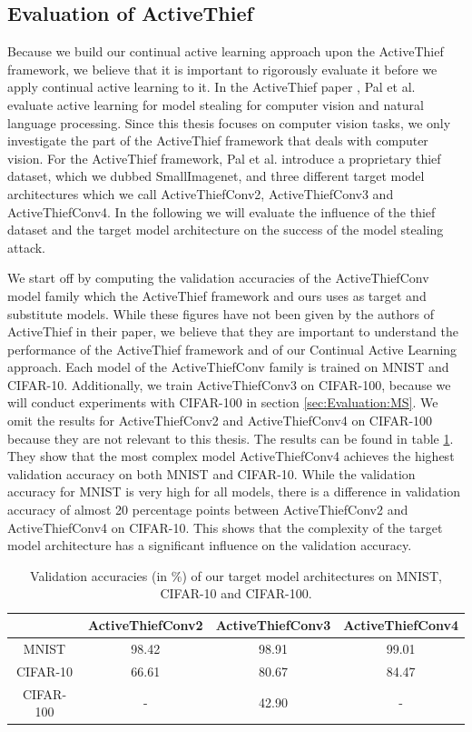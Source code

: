 \subsection{Evaluation of ActiveThief}
\label{sec:Appendix:MS:ActiveThief}
Because we build our continual active learning approach upon the ActiveThief framework, we believe that it is important to rigorously evaluate it before we apply continual
active learning to it. In the ActiveThief paper \cite{pal2020activethief}, Pal et al. evaluate active learning for model stealing for computer vision and natural language
processing. Since this thesis focuses on computer vision tasks, we only investigate the part of the ActiveThief framework that deals with computer vision. For the ActiveThief
framework, Pal et al. introduce a proprietary thief dataset, which we dubbed SmallImagenet, and three different target model architectures which we call ActiveThiefConv2,
ActiveThiefConv3 and ActiveThiefConv4. In the following we will evaluate the influence of the thief dataset and the target model architecture on
the success of the model stealing attack. \par
We start off by computing the validation accuracies of the ActiveThiefConv model family which the ActiveThief framework and ours uses as target and substitute models. While
these figures have not been given by the authors of ActiveThief in their paper, we believe that they are important to understand the performance of the ActiveThief framework
and of our Continual Active Learning approach. Each model of the ActiveThiefConv family is trained on MNIST and CIFAR-10. Additionally, we train ActiveThiefConv3 on CIFAR-100,
because we will conduct experiments with CIFAR-100 in section \ref{sec:Evaluation:MS}. We omit the results for ActiveThiefConv2 and ActiveThiefConv4 on CIFAR-100
because they are not relevant to this thesis. The results can be found in table \ref{fig:TargetModelAccuracies}. They show that the most complex model ActiveThiefConv4
achieves the highest validation accuracy on both MNIST and CIFAR-10. While the validation accuracy for MNIST is very high for all models, there is a difference in validation
accuracy of almost 20 percentage points between ActiveThiefConv2 and ActiveThiefConv4 on CIFAR-10. This shows that the complexity of the target model architecture has a
significant influence on the validation accuracy. \par

\begin{table}[h]
    \centering
    \begin{tabular}{c| c c c} 
        & ActiveThiefConv2 & ActiveThiefConv3 & ActiveThiefConv4 \\ 
        \hline 
        MNIST & 98.42 & 98.91 & 99.01 \\
        CIFAR-10 & 66.61 & 80.67 & 84.47 \\
        CIFAR-100 & - & 42.90 & - \\
    \end{tabular}
    \caption{Validation accuracies (in \%) of our target model architectures on MNIST, CIFAR-10 and CIFAR-100.}
    \label{fig:TargetModelAccuracies}
\end{table}

